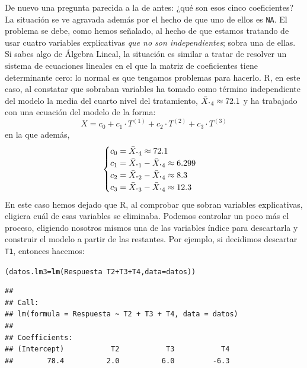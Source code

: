 \documentclass[10pt,a4paper]{article}\usepackage[]{graphicx}\usepackage[]{color}
\makeatletter
\newcommand{\hlopt}[1]{\textcolor[rgb]{0,0,0}{#1}}%
\newcommand{\hlstd}[1]{\textcolor[rgb]{0.345,0.345,0.345}{#1}}%
\newcommand{\hlkwb}[1]{\textcolor[rgb]{0.69,0.353,0.396}{#1}}%
\newcommand{\hlkwc}[1]{\textcolor[rgb]{0.333,0.667,0.333}{#1}}%
\newcommand{\hlkwd}[1]{\textcolor[rgb]{0.737,0.353,0.396}{\textbf{#1}}}%
\newenvironment{kframe}{%
 \def\at@end@of@kframe{}%
 \ifinner\ifhmode%
  \def\at@end@of@kframe{\end{minipage}}%
  \begin{minipage}{\columnwidth}%
 \fi\fi%
 \def\FrameCommand##1{\hskip\@totalleftmargin \hskip-\fboxsep
 \colorbox{shadecolor}{##1}\hskip-\fboxsep
     \hskip-\linewidth \hskip-\@totalleftmargin \hskip\columnwidth}%
 \MakeFramed {\advance\hsize-\width
   \@totalleftmargin\z@ \linewidth\hsize
   \@setminipage}}%
 {\par\unskip\endMakeFramed%
 \at@end@of@kframe}
\newenvironment{knitrout}{}{} %
\newcounter {cont01}
\makeatother
\begin{document}
De nuevo una pregunta parecida a la de antes: ¿qué son esos cinco coeficientes? La situación se ve agravada además por el hecho de que uno de ellos es {\tt NA}. El problema se debe, como hemos señalado, al hecho de que estamos tratando de usar cuatro variables explicativas {\em que no son independientes}; sobra una de ellas. Si sabes algo de Álgebra Lineal, la situación es similar a  tratar de resolver un sistema de ecuaciones lineales en el que la matriz de coeficientes tiene determinante cero: lo normal es que tengamos problemas para hacerlo. R, en este caso, al constatar que sobraban variables ha tomado como término independiente del modelo la media del cuarto nivel del tratamiento, $\bar X_{{\mbox{\bf\large$\cdot$}}4}\approx 72.1$ y ha trabajado con una ecuación del modelo de la forma:
$$X=c_0 + c_1 \cdot T^{(1)} + c_2 \cdot T^{(2)} + c_3 \cdot T^{(3)}$$
en la que además,
$$
\begin{cases}
c_0 = \bar X_{{\mbox{\bf\large$\cdot$}}4}\approx72.1\\
c_1 = \bar X_{{\mbox{\bf\large$\cdot$}}1} - \bar X_{{\mbox{\bf\large$\cdot$}}4}\approx6.299\\
c_2 = \bar X_{{\mbox{\bf\large$\cdot$}}2} - \bar X_{{\mbox{\bf\large$\cdot$}}4}\approx8.3\\
c_3 = \bar X_{{\mbox{\bf\large$\cdot$}}3} - \bar X_{{\mbox{\bf\large$\cdot$}}4}\approx12.3\\
\end{cases}
$$
En este caso hemos dejado que R, al comprobar que sobran variables explicativas, eligiera cuál de esas variables se eliminaba. Podemos controlar un poco más el proceso, eligiendo nosotros mismos una de las variables índice para descartarla y construir el modelo a partir de las restantes. Por ejemplo, si decidimos descartar {\tt T1}, entonces hacemos:
\begin{knitrout}
\color{fgcolor}\begin{kframe}
\begin{alltt}
\hlstd{(datos.lm3} \hlkwb{=} \hlkwd{lm}\hlstd{(Respuesta} \hlopt{~} \hlstd{T2} \hlopt{+} \hlstd{T3} \hlopt{+} \hlstd{T4,} \hlkwc{data} \hlstd{= datos))}
\end{alltt}
\begin{verbatim}
## 
## Call:
## lm(formula = Respuesta ~ T2 + T3 + T4, data = datos)
## 
## Coefficients:
## (Intercept)           T2           T3           T4  
##        78.4          2.0          6.0         -6.3
\end{verbatim}
\end{kframe}
\end{knitrout}
\end{document}
